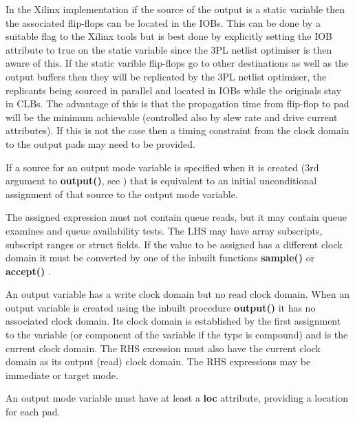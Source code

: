         In the Xilinx implementation if the source of the output is a static
        variable then the associated flip-flops can be located in the IOBs. This
        can be done by a suitable flag to the Xilinx tools but is best done by
        explicitly setting the IOB attribute to true on the static variable since
        the 3PL netlist optimiser is then aware of this. If the static varible
        flip-flops go to other destinations as well as the output buffers then they
        will be replicated by the 3PL netlist optimiser, the replicants being
        sourced in parallel and located in IOBs while the originals stay in CLBs.
        The advantage of this is that the propagation time from flip-flop to pad
        will be the minimum achievable (controlled also by slew rate and drive
        current attributes). If this is not the case then a timing constraint from
        the clock domain to the output pads may need to be provided.
        
        If a source for an output mode variable is specified when it is created
        (3rd argument to {\bf output()}, see ) that
        is equivalent to an initial unconditional assignment of that source
        to the output mode variable.
        
        The assigned expression must not contain queue reads, but it may contain
        queue examines and queue availability tests. The LHS may have array
        subscripts, subscript ranges or struct fields. If the value to be assigned
        has a different clock domain it must be converted by one of the inbuilt
        functions {\bf sample()}  or {\bf accept()}
        .
          
        An output variable has a write clock domain but no read clock domain.
        When an output variable is created using the inbuilt procedure {\bf
        output()}  it has no associated clock domain. Its
        clock domain is established by the first assignment to the variable (or
        component of the variable if the type is compound) and is the current
        clock domain. The RHS exression must also have the current clock domain
        as its output (read) clock domain. The RHS expressions may be immediate
        or target mode. 
        
        An output mode variable must have at least a {\bf loc} attribute,
        providing a location for each pad.
        
        



